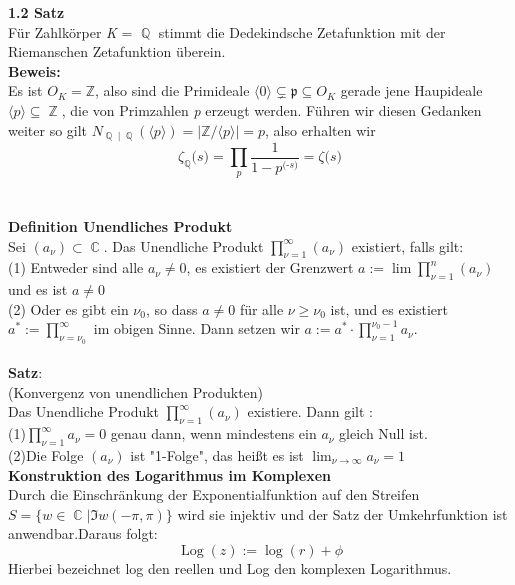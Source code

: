 \documentclass[10pt,a4paper]{article}
\DeclareMathOperator{\C}{\mathbb{C}}
\DeclareMathOperator{\Q}{\mathbb{Q}}
\DeclareMathOperator{\Z}{\mathbb{Z}}
\DeclareMathOperator{\Log}{Log}
\begin{document}
\textbf{1.2 Satz }
\\
Für Zahlkörper \textit{K} = $\Q$ stimmt die Dedekindsche Zetafunktion mit der Riemanschen Zetafunktion überein.
\\
\textbf{Beweis:}
\\
Es ist $O_\textit{K} = \mathbb{Z}$, also sind die Primideale $\langle0\rangle\subsetneq \mathfrak{p} \subseteq O_{\textit{K}}$ gerade jene Haupideale $\langle \textit{p}\rangle\subseteq\Z$, die von Primzahlen \textit{p} erzeugt werden. Führen wir diesen Gedanken weiter so gilt $N_{\Q\mid\Q}(\langle \textit{p}\rangle) = | \mathbb{Z}/\langle \textit{p}\rangle| = \textit{p}$, also erhalten wir  $$\zeta_{\Q} \textit{(s)}= \prod_{\textit{p}} \frac{1}{1-\textit{p}^\textit{(-s)}} = \zeta \textit{(s)} $$
\\
\\
\textbf{Definition Unendliches Produkt}
\\
Sei $(a_{\nu})\subset \C$. Das Unendliche Produkt $\prod_{\nu = 1 }^{\infty}(a_{\nu})$ existiert, falls gilt:
\\
(1) Entweder sind alle $a_{\nu}\neq 0$, es existiert der Grenzwert $ a := \lim \prod_{\nu = 1}^{n} (a_{\nu})$ und es ist $a \neq 0$
\\
(2) Oder es gibt ein $\nu_{0}$, so dass $a \neq 0$ für alle $\nu \geq \nu_{0}$ ist, und es existiert $a^{*} := \prod_{\nu = \nu_{0}}^{\infty}$ im obigen Sinne. Dann setzen wir $a := a^{*} 
\cdot \prod_{\nu = 1}^{\nu_{0} - 1}a_{\nu}$.
\\
\\
\textbf{Satz}: 
\\
(Konvergenz von unendlichen Produkten)
\\
Das Unendliche Produkt $\prod_{\nu = 1 }^{\infty}(a_{\nu})$ existiere. Dann gilt :
\\
(1)$\prod_{\nu = 1}^{\infty}a_{\nu} = 0$ genau dann, wenn mindestens ein $a_{\nu}$ gleich Null ist.
\\
(2)Die Folge $(a_{\nu})$ ist "1-Folge", das heißt es ist $\lim_{\nu \rightarrow\infty}a_{\nu} = 1$
\\
\textbf{Konstruktion des Logarithmus im Komplexen}
\\
Durch die Einschränkung der Exponentialfunktion auf den Streifen $S = \{ w \in \C | \Im{w}(-\pi, \pi)\}$ wird sie injektiv und der Satz der Umkehrfunktion ist anwendbar.Daraus folgt:$$\Log(z) := \log(r) + \phi$$Hierbei bezeichnet log den reellen und Log den komplexen Logarithmus.
\\
\\
\end{document}
